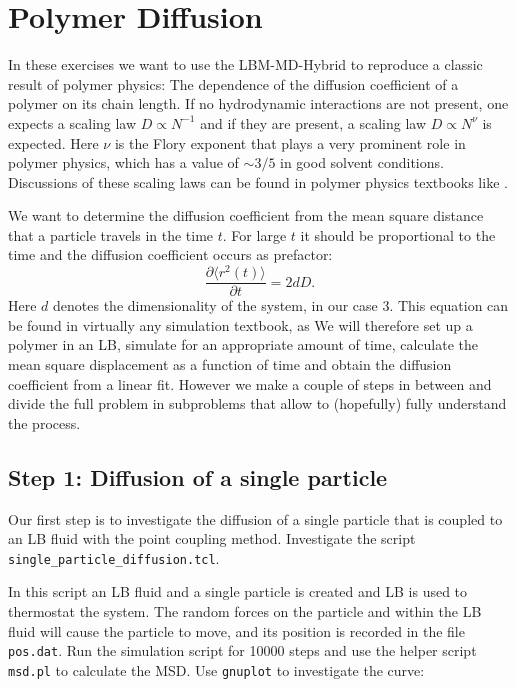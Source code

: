 
\chapter{Polymer Diffusion}
In these exercises we want to use the LBM-MD-Hybrid to reproduce a classic
result of polymer physics: The dependence of the diffusion coefficient
of a polymer on its chain length. If no hydrodynamic interactions
are not present, one expects a scaling law $D \propto N^{-1}$ and if 
they are present, a scaling law $D \propto N^{\nu}$ is expected. 
Here $\nu$ is the Flory exponent that plays a very prominent role
in polymer physics, which has a value of $\sim 3/5$ in good solvent
conditions. Discussions of these scaling laws can be found
in polymer physics textbooks like \cite{degennes, doi, rubinstein}.


We want to determine the diffusion coefficient from the mean square
distance that a particle travels in the time $t$. For large $t$ it should
be proportional to the time and the diffusion coefficient occurs as 
prefactor: 
\begin{equation}
  \frac{\partial \langle r^2 \left(t\right)\rangle}{\partial t} = 2 d D. 
  \label{eq:msd}
\end{equation}
Here $d$ denotes the dimensionality of the system, in our case 3.
This equation can be found in virtually any simulation textbook, as 
\cite{frenkel}
We will therefore set up a polymer in an LB, simulate for an appropriate
amount of time, calculate the mean square displacement as a function of
time and obtain the diffusion coefficient from a linear fit. However
we make a couple of steps in between and divide the full problem in 
subproblems that allow to (hopefully) fully understand the process.

\section{Step 1: Diffusion of a single particle}
Our first step is to investigate the diffusion of a single particle
that is coupled to an LB fluid with the point coupling method.
Investigate the script  \lstinline|single_particle_diffusion.tcl|.

In this script an LB fluid and a single particle is created and LB is
used to thermostat the system. The random forces on the particle and
within the LB fluid will cause the particle to move, and its position
is recorded in the file  \lstinline|pos.dat|. Run the simulation script for 10000 steps
and use the helper script  \lstinline|msd.pl| to calculate the MSD. Use  \lstinline|gnuplot|
to investigate the curve:


